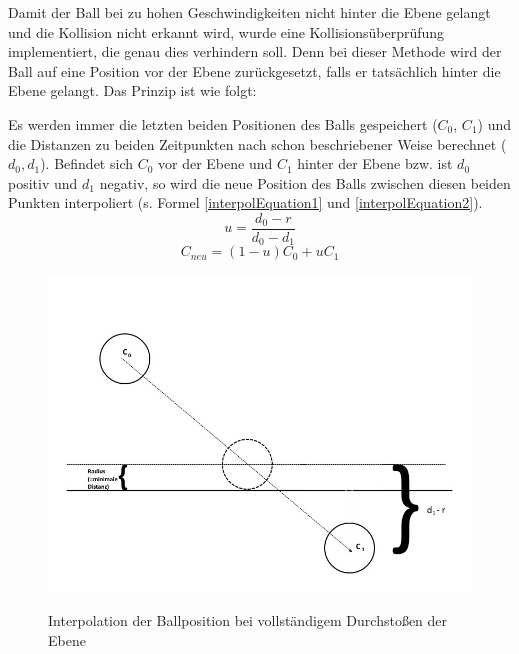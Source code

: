 Damit der Ball bei zu hohen Geschwindigkeiten nicht hinter die Ebene gelangt und die Kollision nicht erkannt wird, wurde eine Kollisionsüberprüfung implementiert, die genau dies verhindern soll. Denn bei dieser Methode wird der Ball auf eine Position vor der Ebene zurückgesetzt, falls er tatsächlich hinter die Ebene gelangt. Das Prinzip ist wie folgt:

Es werden immer die letzten beiden Positionen des Balls gespeichert ($C_0$, $C_1$) und die Distanzen zu beiden Zeitpunkten nach schon beschriebener Weise berechnet ($d_0, d_1$).
Befindet sich $C_0$ vor der Ebene und $C_1$ hinter der Ebene bzw. ist $d_0$ positiv und $d_1$ negativ, so wird die neue Position des Balls zwischen diesen beiden Punkten interpoliert (s. Formel \ref{interpolEquation1} und \ref{interpolEquation2}). 
\begin{equation}	
\label{interpolEquation1}
	u = \frac{d_0 - r}{d_0 - d_1}
\end{equation}
\begin{equation}	
\label{interpolEquation2}
	C_{neu} = (1-u)C_0 + uC_1
\end{equation}

\begin{figure}[h]
   \begin{center}
       \includegraphics[scale=0.5]{bilder/interpolation}\label{fig_interpolation}
   \end{center}
    
    \caption{Interpolation der Ballposition bei vollständigem Durchstoßen der Ebene}
        \label{fig_interpol}
\end{figure} 

